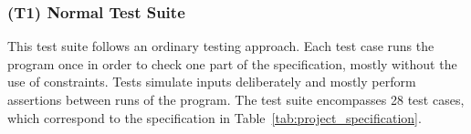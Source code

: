 \subsubsection{(T1) Normal Test Suite}

This test suite follows an ordinary testing approach.
Each test case runs the program once in order to check one part of the specification,
mostly without the use of constraints.
Tests simulate inputs deliberately and mostly perform assertions between runs of the program.
The test suite encompasses 28 test cases, which correspond to the specification in Table~\ref{tab:project_specification}.
\parspace

%
%
%
%
%

